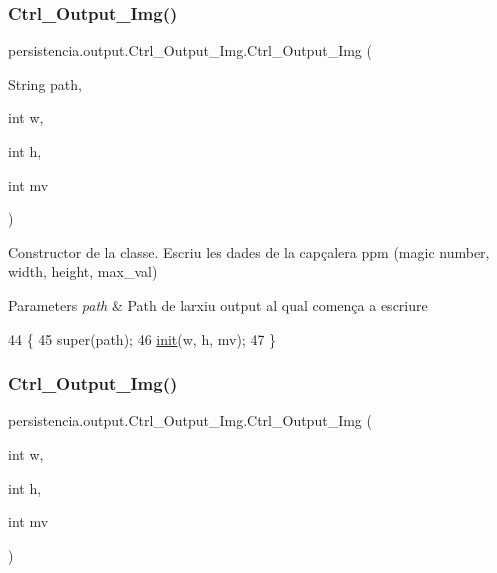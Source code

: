\subsubsection{\texorpdfstring{Ctrl\+\_\+\+Output\+\_\+\+Img()}{Ctrl\_Output\_Img()}\hspace{0.1cm}{\footnotesize\ttfamily [1/2]}}
{\footnotesize\ttfamily persistencia.\+output.\+Ctrl\+\_\+\+Output\+\_\+\+Img.\+Ctrl\+\_\+\+Output\+\_\+\+Img (\begin{DoxyParamCaption}\item[{String}]{path,  }\item[{int}]{w,  }\item[{int}]{h,  }\item[{int}]{mv }\end{DoxyParamCaption})\hspace{0.3cm}{\ttfamily [inline]}}



Constructor de la classe. Escriu les dades de la capçalera ppm (magic number, width, height, max\+\_\+val) 


\begin{DoxyParams}{Parameters}
{\em path} & Path de l\textquotesingle{}arxiu output al qual comença a escriure \\
\hline
\end{DoxyParams}

\begin{DoxyCode}
44                                                               \{
45         super(path);
46         \hyperlink{classpersistencia_1_1output_1_1Ctrl__Output__Img_aab3258280bd6abb81d580c93eb68fb28}{init}(w, h, mv);        
47     \}
\end{DoxyCode}
\mbox{\label{classpersistencia_1_1output_1_1Ctrl__Output__Img_aa0e106a1fc829ebba51e0ba6d9d65a63}} 
\subsubsection{\texorpdfstring{Ctrl\+\_\+\+Output\+\_\+\+Img()}{Ctrl\_Output\_Img()}\hspace{0.1cm}{\footnotesize\ttfamily [2/2]}}
{\footnotesize\ttfamily persistencia.\+output.\+Ctrl\+\_\+\+Output\+\_\+\+Img.\+Ctrl\+\_\+\+Output\+\_\+\+Img (\begin{DoxyParamCaption}\item[{int}]{w,  }\item[{int}]{h,  }\item[{int}]{mv }\end{DoxyParamCaption})\hspace{0.3cm}{\ttfamily [inline]}}



